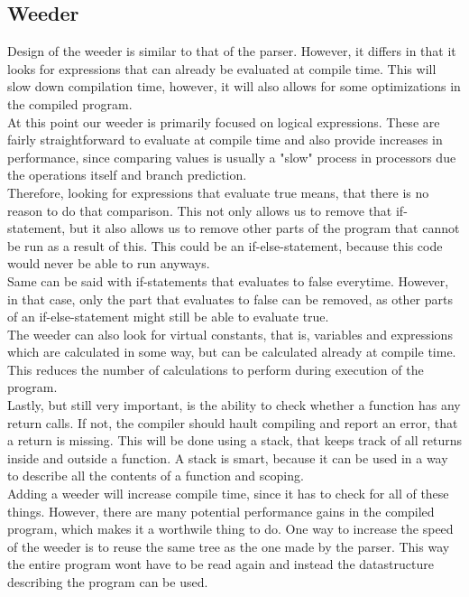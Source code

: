 \documentclass[a4paper,10pt,titlepage]{report}
\begin{document}
\subsection{Weeder}
Design of the weeder is similar to that of the parser. However, it differs in that it looks for expressions that can already be evaluated at compile time. This will slow down compilation time, however, it will also allows for some optimizations in the compiled program. \\
At this point our weeder is primarily focused on logical expressions. These are fairly straightforward to evaluate at compile time and also provide increases in performance, since comparing values is usually a "slow" process in processors due the operations itself and branch prediction.\\
\vspace{6px}
Therefore, looking for expressions that evaluate true means, that there is no reason to do that comparison. This not only allows us to remove that if-statement, but it also allows us to remove other parts of the program that cannot be run as a result of this. This could be an if-else-statement, because this code would never be able to run anyways. \\
Same can be said with if-statements that evaluates to false everytime. However, in that case, only the part that evaluates to false can be removed, as other parts of an if-else-statement might still be able to evaluate true.\\
\vspace{6px}
The weeder can also look for virtual constants, that is, variables and expressions which are calculated in some way, but can be calculated already at compile time. This reduces the number of calculations to perform during execution of the program.\\
\vspace{6px}
Lastly, but still very important, is the ability to check whether a function has any return calls. If not, the compiler should hault compiling and report an error, that a return is missing. This will be done using a stack, that keeps track of all returns inside and outside a function. A stack is smart, because it can be used in a way to describe all the contents of a function and scoping.\\
\vspace{6px}
Adding a weeder will increase compile time, since it has to check for all of these things. However, there are many potential performance gains in the compiled program, which makes it a worthwile thing to do. One way to increase the speed of the weeder is to reuse the same tree as the one made by the parser. This way the entire program wont have to be read again and instead the datastructure describing the program can be used.
\end{document}
